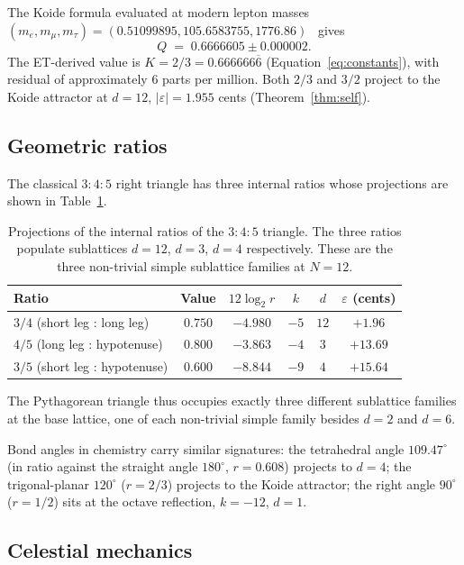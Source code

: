 \documentclass[11pt,a4paper]{article}
\theoremstyle{definition}
\theoremstyle{remark}
\newcommand{\eps}{\varepsilon}
\begin{document}
The Koide formula evaluated at modern lepton masses $(m_{e},m_{\mu},m_{\tau}) = (0.51099895, 105.6583755, 1776.86)$~\cite{CODATA2022} gives
\[
Q \;=\; 0.6666605\pm 0.000002.
\]
The ET-derived value is $K = 2/3 = 0.666666\overline{6}$ (Equation~\ref{eq:constants}), with residual of approximately $6$ parts per million. Both $2/3$ and $3/2$ project to the Koide attractor at $d=12$, $|\eps|=1.955$ cents (Theorem~\ref{thm:self}).

\subsection{Geometric ratios}\label{subsec:geometry}

The classical $3{:}4{:}5$ right triangle has three internal ratios whose projections are shown in Table~\ref{tab:pyth}.

\begin{table}[h]
\centering
\begin{tabular}{@{}l c c c c c@{}}
\toprule
Ratio & Value & $12\log_{2}r$ & $k$ & $d$ & $\eps$ (cents)\\
\midrule
$3/4$ (short leg : long leg) & $0.750$ & $-4.980$ & $-5$ & $12$ & $+1.96$\\
$4/5$ (long leg : hypotenuse) & $0.800$ & $-3.863$ & $-4$ & $3$ & $+13.69$\\
$3/5$ (short leg : hypotenuse) & $0.600$ & $-8.844$ & $-9$ & $4$ & $+15.64$\\
\bottomrule
\end{tabular}
\caption{Projections of the internal ratios of the $3{:}4{:}5$ triangle. The three ratios populate sublattices $d=12$, $d=3$, $d=4$ respectively. These are the three non-trivial simple sublattice families at $N=12$.}
\label{tab:pyth}
\end{table}

The Pythagorean triangle thus occupies exactly three different sublattice families at the base lattice, one of each non-trivial simple family besides $d=2$ and $d=6$.

Bond angles in chemistry carry similar signatures: the tetrahedral angle $109.47^{\circ}$ (in ratio against the straight angle $180^{\circ}$, $r = 0.608$) projects to $d=4$; the trigonal-planar $120^{\circ}$ ($r = 2/3$) projects to the Koide attractor; the right angle $90^{\circ}$ ($r = 1/2$) sits at the octave reflection, $k=-12$, $d=1$.

\subsection{Celestial mechanics}\label{subsec:celestial}
\end{document}
